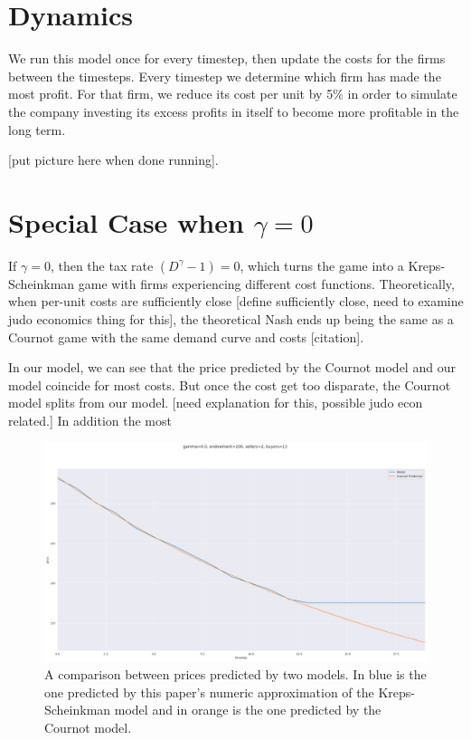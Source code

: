 \documentclass[11pt]{article}
\begin{document}
\section{Dynamics}
We run this model once for every timestep, then update the costs for the firms
between the timesteps. Every timestep we determine which firm has made the most
profit. For that firm, we reduce its cost per unit by 5\% in order to simulate
the company investing its excess profits in itself to become more profitable in
the long term. 

[put picture here when done running].

\section{Special Case when $\gamma = 0$}
If $\gamma = 0$, then the tax rate $(D^\gamma - 1) = 0$, which turns the game
into a Kreps-Scheinkman game with firms experiencing different cost functions. 
Theoretically, when per-unit costs are sufficiently close [define sufficiently
close, need to examine judo economics thing for this], the theoretical
Nash ends up being the same as a Cournot game with the same demand curve
and costs [citation].

In our model, we can see that the price predicted by the Cournot model and our
model coincide for most costs. But once the cost get too disparate, the Cournot
model splits from our model. [need explanation for this, possible judo econ
related.] In addition the most

\begin{figure}
  \includegraphics[width=\linewidth]{CournotVsModel.png}
  \caption{A comparison between prices predicted by two models. In blue is the
  one predicted by this paper's numeric approximation of the Kreps-Scheinkman
  model and in orange is the one predicted by the Cournot model.}
  \label{fig:figCournotVsModel}
\end{figure}
\end{document}
